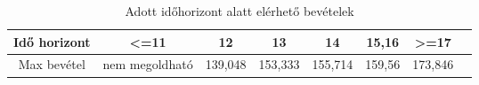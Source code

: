 \begin{table}[H]
	\begin{center}
		\caption{Adott időhorizont alatt elérhető bevételek}
  		\captionsetup[table]{skip=10pt}
    	\label{tab:table2}
		\begin{tabular}{|c|c|c|c|c|c|c|c|}
		\hline
		Idő horizont & \textless =11 & 12 & 13 & 14 & 15,16 & \textgreater =17\\
		\hline
		Max bevétel & nem megoldható & 139,048 & 153,333 & 155,714 & 159,56 & 173,846\\
		\hline
		\end{tabular}	
	\end{center}	
\end{table}
